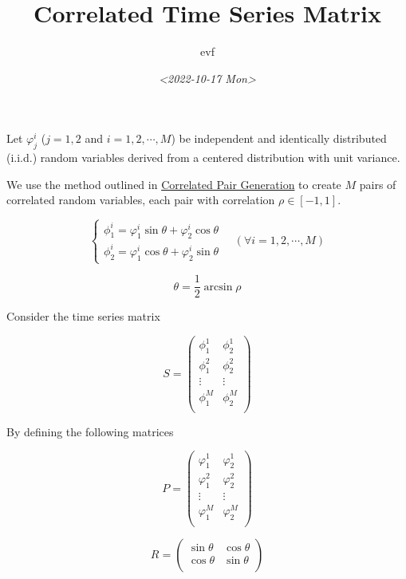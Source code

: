 \documentclass{article}[a4]
\author{evf}
\date{\textit{<2022-10-17 Mon>}}
\title{Correlated Time Series Matrix}
\begin{document}
\maketitle
\tableofcontents

Let \(\varphi_j^i\) (\(j=1,2\) and \(i=1,2,\cdots,M\)) be independent and identically distributed (i.i.d.) random variables derived from a centered distribution with unit variance.

We use the method outlined in \href{correlated\_variables.org}{Correlated Pair Generation} to create \(M\) pairs of correlated random variables, each pair with correlation \(\rho \in [-1,1]\).

\begin{equation*}
\begin{cases}
    \phi_1^i = \varphi_1^i \sin \theta + \varphi_2^i \cos \theta \\
    \phi_2^i = \varphi_1^i \cos \theta + \varphi_2^i \sin \theta
\end{cases}
\quad (\forall i = 1, 2, \cdots, M)
\end{equation*}

\[ \theta = \frac{1}{2} \arcsin \rho\]

Consider the time series matrix

\begin{equation*}
S =
\begin{pmatrix}
\phi_1^1 & \phi_2^1 \\
\phi_1^2 & \phi_2^2 \\
\vdots     & \vdots     \\
\phi_1^M & \phi_2^M \\
\end{pmatrix}
\end{equation*}

By defining the following matrices

\begin{equation*}
P =
\begin{pmatrix}
\varphi_1^1 & \varphi_2^1 \\
\varphi_1^2 & \varphi_2^2 \\
\vdots     & \vdots     \\
\varphi_1^M & \varphi_2^M \\
\end{pmatrix}
\end{equation*}

\begin{equation*}
R =
\begin{pmatrix}
\sin \theta & \cos \theta \\
\cos \theta & \sin \theta \\
\end{pmatrix}
\end{equation*}
\end{document}
